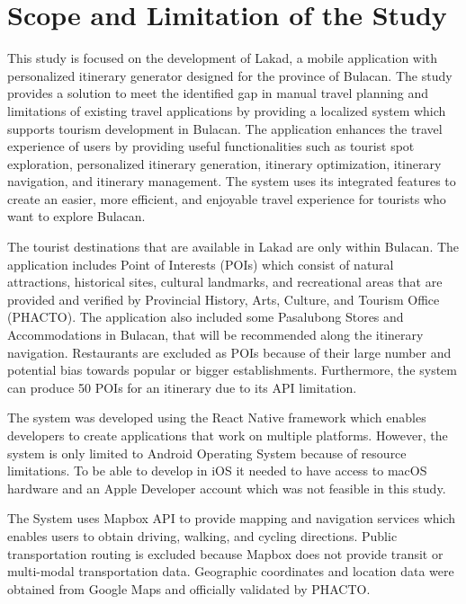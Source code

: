 \section{Scope and Limitation of the Study}

This study is focused on the development of Lakad, a mobile application with personalized itinerary generator designed for the province of Bulacan. The study provides a solution to meet the identified gap in manual travel planning and limitations of existing travel applications by providing a localized system which supports tourism development in Bulacan. The application enhances the travel experience of users by providing useful functionalities such as tourist spot exploration, personalized itinerary generation, itinerary optimization, itinerary navigation, and itinerary management. The system uses its integrated features to create an easier, more efficient, and enjoyable travel experience for tourists who want to explore Bulacan.

The tourist destinations that are available in Lakad are only within Bulacan. The application includes Point of Interests (POIs) which consist of natural attractions, historical sites, cultural landmarks, and recreational areas that are provided and verified by Provincial History, Arts, Culture, and Tourism Office (PHACTO). The application also included some Pasalubong Stores and Accommodations in Bulacan, that will be recommended along the itinerary navigation. Restaurants are excluded as POIs because of their large number and potential bias towards popular or bigger establishments. Furthermore, the system can produce 50 POIs for an itinerary due to its API limitation.

The system was developed using the React Native framework which enables developers to create applications that work on multiple platforms. However, the system is only limited to Android Operating System because of resource limitations. To be able to develop in iOS it needed to have access to macOS hardware and an Apple Developer account which was not feasible in this study. 

The System uses Mapbox API to provide mapping and navigation services which enables users to obtain driving, walking, and cycling directions. Public transportation routing is excluded because Mapbox does not provide transit or multi-modal transportation data. Geographic coordinates and location data were obtained from Google Maps and officially validated by PHACTO.

